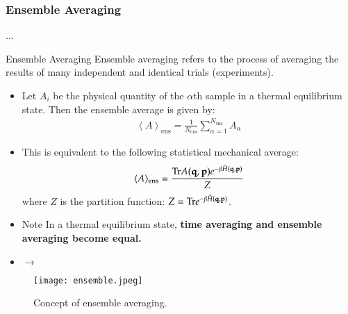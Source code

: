 \documentclass[aspectratio=169,dvipdfmx,cjk,handout,hyperref,8pt]{beamer} %
\newcommand{\TK}[1]{{\bf \color{red} #1}}
\theoremstyle{example}
\newcommand{\bi}{\begin{itemize}}
\newcommand{\ei}{\end{itemize}}
\newcommand{\ave}[1]{\left\langle {#1} \right\rangle}
\begin{document}
\subsubsection{Ensemble Averaging}
\begin{frame}{\thesection.\thesubsection.\thesubsubsection.~\insertsubsubsection} 
\begin{exampleblock}{Ensemble Averaging}
Ensemble averaging refers to the process of averaging the results of many independent and identical trials (experiments).
\end{exampleblock}
\bi
\item Let $A_i$ be the physical quantity of the $\alpha$th sample in a thermal equilibrium state. Then the ensemble average is given by:
\begin{eqnarray}
\ave{A}_{\mathrm{ens}}=\frac{1}{N_{\mathrm{ens}}}\sum_{\alpha=1}^{N_{\mathrm{ens}}}A_\alpha
\end{eqnarray}
\item This is equivalent to the following statistical mechanical average:
\begin{eqnarray}
\langle A \rangle_{\mathrm{ens}}  = \frac{{\rm Tr} A({\bf q},{\bf p})e^{-\beta \hat{H}({\bf q},{\bf p})}}{Z} 
\end{eqnarray}
where $Z$ is the partition function: $Z= {\rm Tr} e^{-\beta \hat{H}({\bf q},{\bf p})}$.
\item[Note] In a thermal equilibrium state, \TK{time averaging and ensemble averaging become equal.}
\item[$\to$] \TK{}
\ei

\begin{figure}
\texttt{[image: ensemble.jpeg]}
\caption{Concept of ensemble averaging.}
\label{fig:fig0}
\end{figure}


\end{frame}
\end{document}
